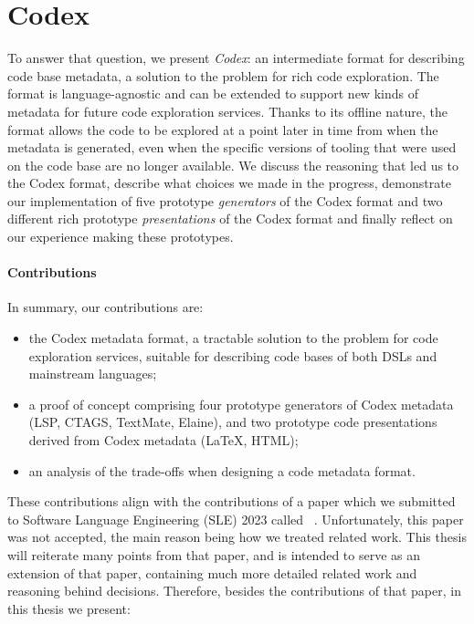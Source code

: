 \section*{Codex}

To answer that question, we present \emph{Codex}: an intermediate format for describing code base metadata, a solution to the \problem{\times} problem for rich code exploration.
The format is language-agnostic and can be extended to support new kinds of metadata for future code exploration services.
Thanks to its offline nature, the format allows the code to be explored at a point later in time from when the metadata is generated, even when the specific versions of tooling that were used on the code base are no longer available.
We discuss the reasoning that led us to the Codex format, describe what choices we made in the progress, demonstrate our implementation of
five prototype \emph{generators} of the Codex format and two different rich prototype \emph{presentations} of the Codex format and finally reflect on our experience making these prototypes. %

\paragraph{Contributions}

In summary, our contributions are:
\begin{itemize}
    \item the Codex metadata format, a tractable solution to the \problem{\times} problem for code exploration services, suitable for describing code bases of both DSLs and mainstream languages;
    \item a proof of concept comprising four prototype generators of Codex metadata (LSP, CTAGS, TextMate, Elaine), and two prototype code presentations derived from Codex metadata (LaTeX, HTML);
    \item an analysis of the trade-offs when designing a code metadata format.
\end{itemize}

These contributions align with the contributions of a paper which we submitted to Software Language Engineering (SLE) 2023 called ~\autocite{our_paper}.
Unfortunately, this paper was not accepted, the main reason being how we treated related work.
This thesis will reiterate many points from that paper, and is intended to serve as an extension of that paper, containing much more detailed related work and reasoning behind decisions.
Therefore, besides the contributions of that paper, in this thesis we present:


